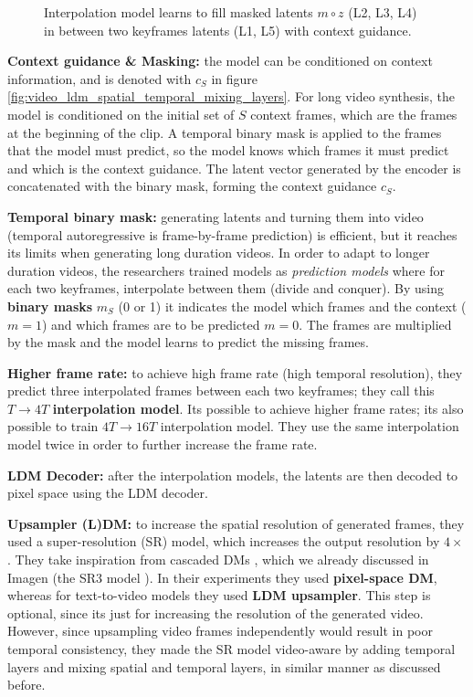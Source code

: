 \begin{figure}
    \centering
    \scalebox{0.5}{
        
    }
    \caption{Interpolation model learns to fill masked latents $m \circ z$ (L2, L3, L4) in between two keyframes latents (L1, L5) with context guidance.}
\end{figure}

\textbf{Context guidance \& Masking:} the model can be conditioned on context information, and is denoted with $c_S$ in figure \ref{fig:video_ldm_spatial_temporal_mixing_layers}. For long video synthesis, the model is conditioned on the initial set of $S$ context frames, which are the frames at the beginning of the clip. A temporal binary mask is applied to the frames that the model must predict, so the model knows which frames it must predict and which is the context guidance. The latent vector generated by the encoder is concatenated with the binary mask, forming the context guidance $c_S$.

\textbf{Temporal binary mask:} generating latents and turning them into video (temporal autoregressive is frame-by-frame prediction) is efficient, but it reaches its limits when generating long duration videos. In order to adapt to longer duration videos, the researchers trained models as \textit{prediction models} where for each two keyframes, interpolate between them (divide and conquer). By using \textbf{binary masks} $m_S$ (0 or 1) it indicates the model which frames and the context ($m = 1$) and which frames are to be predicted $m = 0$. The frames are multiplied by the mask and the model learns to predict the missing frames.

\textbf{Higher frame rate:} to achieve high frame rate (high temporal resolution), they predict three interpolated frames between each two keyframes; they call this $T \rightarrow 4T$ \textbf{interpolation model}. Its possible to achieve higher frame rates; its also possible to train $4T \rightarrow 16T$ interpolation model. They use the same interpolation model twice in order to further increase the frame rate.

\textbf{LDM Decoder: } after the interpolation models, the latents are then decoded to pixel space using the LDM decoder.

\textbf{Upsampler (L)DM: } to increase the spatial resolution of generated frames, they used a super-resolution (SR) model, which increases the output resolution by $4 \times $. They take inspiration from cascaded DMs \cite{cascaded_diffusion_models}, which we already discussed in Imagen (the SR3 model \cite{sr3}). In their experiments they used \textbf{pixel-space DM}, whereas for text-to-video models they used \textbf{LDM upsampler}. This step is optional, since its just for increasing the resolution of the generated video. However, since upsampling video frames independently would result in poor temporal consistency, they made the SR model video-aware by adding temporal layers and mixing spatial and temporal layers, in similar manner as discussed before.

